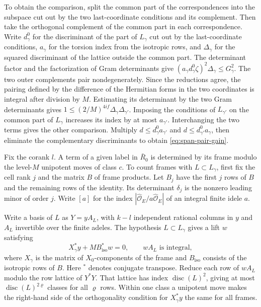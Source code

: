 To obtain the comparison, split the common part of the correspondences
into the subspace cut out by the two last-coordinate conditions and its
complement. Then take the orthogonal complement of the common part in
each correspondence. Write \(d_\gamma^0\) for the discriminant of the
part of \(L_\gamma\) cut out by the last-coordinate conditions,
\(a_\gamma\) for the torsion index from the isotropic rows, and
\(\Delta_\gamma\) for the squared discriminant of the lattice outside the
common part. The determinant factor and the factorization of Gram
determinants give
\((a_\gamma d_\gamma^0\zeta)^2\Delta_\gamma\le G_\gamma^2\).
The two outer complements pair nondegenerately. Since the reductions
agree, the pairing defined by the difference of the Hermitian forms in
the two coordinates is integral after division by \(M\). Estimating its
determinant by the two Gram determinants gives
\(1\le(2/M)^{4if}\Delta_\gamma\Delta_{\gamma'}\).
Imposing the conditions of \(L_{\gamma'}\) on the common part of
\(L_\gamma\) increases its index by at most \(a_{\gamma'}\). Interchanging
the two terms gives the other comparison. Multiply
\(d\le d_\gamma^0a_{\gamma'}\) and \(d\le d_{\gamma'}^0a_\gamma\), then
eliminate the complementary discriminants to obtain
\eqref{eq:span-pair-gain}.

Fix the corank \(l\). A term of a given label in \(\bar R_0\) is
determined by its frame modulo the level-\(M\) unipotent moves of class
\(c\). To count frames with \(L\subset L_\gamma\), first fix the cell rank
\(j\) and the matrix \(B\) of frame products. Let \(B_j\) have the
first \(j\) rows of \(B\) and the remaining rows of the identity.
Its determinant \(\delta_j\) is the nonzero leading minor of order \(j\). Write \([a]\) for the index
\(|\widehat{\mathcal O}_E/a\widehat{\mathcal O}_E|\) of an integral finite idele \(a\).

Write a basis of \(L\) as \(Y=yA_L\), with \(k-l\) independent rational
columns in \(y\) and \(A_L\) invertible over the finite adeles.
The hypothesis \(L\subset L_\gamma\) gives a lift \(w\) satisfying
\[
 X_\gamma^*y+M B_{\mathrm{iso}}^*w=0,\qquad
 wA_L\text{ is integral},
\]
where \(X_\gamma\) is the matrix of \(X_0\)-components of the frame and
\(B_{\mathrm{iso}}\) consists of the isotropic rows of \(B\).
Here \({}^*\) denotes conjugate transpose. Reduce each row of \(wA_L\)
modulo the row lattice of \(Y^*Y\). That lattice has index
\(\operatorname{disc}(L)^2\), giving at most
\(\operatorname{disc}(L)^{2\varrho}\) classes for all \(\varrho\) rows.
Within one class a unipotent move makes the right-hand side of the
orthogonality condition for \(X_\gamma^*y\) the same for all frames.

